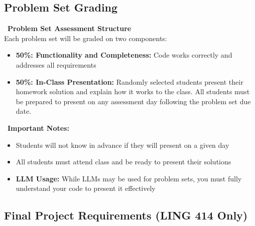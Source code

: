\documentclass[11pt,letterpaper]{article}
\begin{document}
\subsection{Problem Set Grading}

\begin{tcolorbox}[
    colback=lightgray,
    colframe=darkgray,
    boxrule=1pt,
    arc=2mm,
    left=10pt,
    right=10pt
]
\faEdit\ \textbf{Problem Set Assessment Structure}\\[0.3em]
Each problem set will be graded on two components:
\vspace{0.2em}
\begin{itemize}[leftmargin=*,itemsep=2pt]
    \item \textbf{50\%: Functionality and Completeness:} Code works correctly and addresses all requirements
    \item \textbf{50\%: In-Class Presentation:} Randomly selected students present their homework solution and explain how it works to the class. All students must be prepared to present on any assessment day following the problem set due date.
\end{itemize}
\vspace{0.5em}
\faExclamationTriangle\ \textbf{Important Notes:}
\begin{itemize}[leftmargin=*,itemsep=2pt]
    \item Students will not know in advance if they will present on a given day
    \item All students must attend class and be ready to present their solutions
    \item \textbf{LLM Usage:} While LLMs may be used for problem sets, you must fully understand your code to present it effectively
\end{itemize}
\end{tcolorbox}

\subsection{Final Project Requirements (LING 414 Only)}
\end{document}
